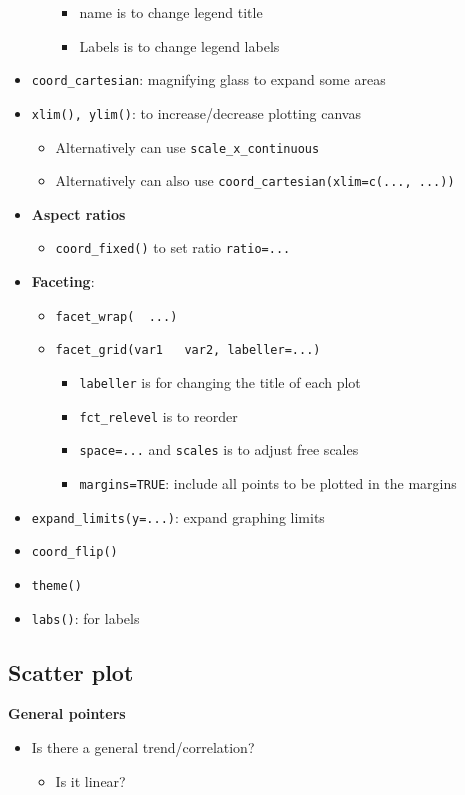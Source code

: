 \documentclass{article}
\begin{document}
\begin{multicols}{2}
\begin{itemize}
\begin{itemize}
{\begin{itemize}
			\item name is to change legend title
			\item Labels is to change legend labels
	\end{itemize}}
	\end{itemize}
	\item \texttt{coord\_cartesian}: magnifying glass to expand some areas
	\item \texttt{xlim(), ylim()}: to increase/decrease plotting canvas
	\begin{itemize}
		\item Alternatively can use \texttt{scale\_x\_continuous}
		\item Alternatively can also use \texttt{coord\_cartesian(xlim=c(..., ...))}
	\end{itemize}
    \item \textbf{Aspect ratios}
    \begin{itemize}
    	\item \texttt{coord\_fixed()} to set ratio \texttt{ratio=...}
    \end{itemize}
	\item \textbf{Faceting}:
	\begin{itemize}
		\item \texttt{facet\_wrap(~ ...)}
		\item \texttt{facet\_grid(var1 ~ var2, labeller=...)}
		\begin{itemize}
			\item \texttt{labeller} is for changing the title of each plot
			\item \texttt{fct\_relevel} is to reorder
			\item \texttt{space=...} and \texttt{scales} is to adjust free scales
			\item \texttt{margins=TRUE}: include all points to be plotted in the margins
		\end{itemize}
	\end{itemize}
	\item \texttt{expand\_limits(y=...)}: expand graphing limits
	\item \texttt{coord\_flip()}
	\item \texttt{theme()}
	\item \texttt{labs()}: for labels
\end{itemize}

\subsection{Scatter plot}
\textbf{General pointers}
\begin{itemize}
	\item Is there a general trend/correlation?
	\begin{itemize}
		\item Is it linear?


\end{itemize}
\end{itemize}
\end{multicols}
\end{document}
